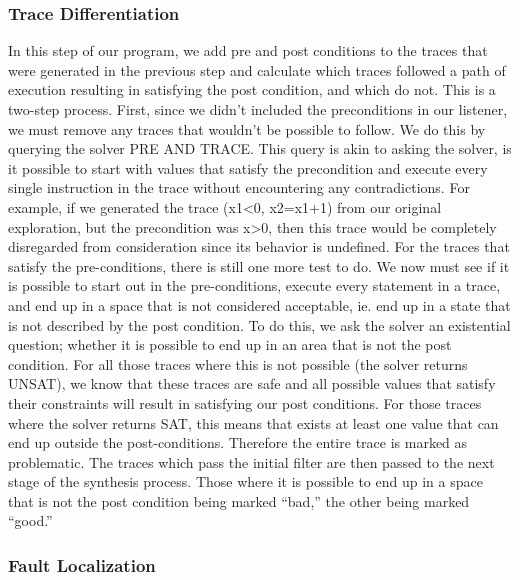 \documentclass[]{article}
\begin{document}
\subsubsection{Trace Differentiation}
In this step of our program, we add pre and post conditions to the traces that were generated in the previous step and calculate which traces followed a path of execution resulting in satisfying the post condition, and which do not.  This is a two-step process.  First, since we didn't included the preconditions in our listener, we must remove any traces that wouldn't be possible to follow.  We do this by querying the solver PRE AND TRACE.  This query is akin to asking the solver, is it possible to start with values that satisfy the precondition and execute every single instruction in the trace without encountering any contradictions.  For example, if we generated the trace (x1<0, x2=x1+1) from our original exploration, but the precondition was x>0, then this trace would be completely disregarded from consideration since its behavior is undefined.  For the traces that satisfy the pre-conditions, there is still one more test to do.  We now must see if it is possible to start out in the pre-conditions, execute every statement in a trace, and end up in a space that is not considered acceptable, ie. end up in a state that is not described by the post condition.  To do this, we ask the solver an existential question; whether it is possible to end up in an area that is not the post condition.  For all those traces where this is not possible (the solver returns UNSAT), we know that these traces are safe and all possible values that satisfy their constraints will result in satisfying our post conditions.  For those traces where the solver returns SAT, this means that exists at least one value that can end up outside the post-conditions.  Therefore the entire trace is marked as problematic.  The traces which pass the initial filter are then passed to the next stage of the synthesis process.  Those where it is possible to end up in a space that is not the post condition being marked ``bad,'' the other being marked ``good.''

\subsubsection{Fault Localization}
\end{document}
